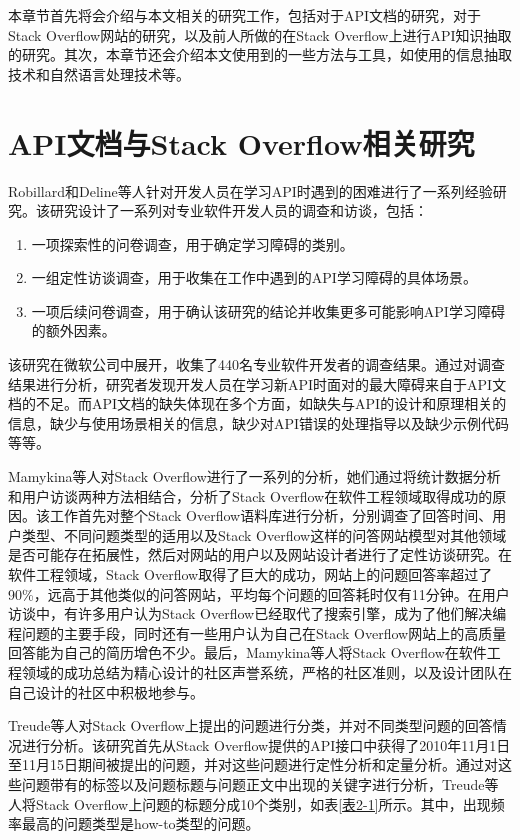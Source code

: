 本章节首先将会介绍与本文相关的研究工作，包括对于API文档的研究，对于Stack Overflow网站的研究，以及前人所做的在Stack Overflow上进行API知识抽取的研究。其次，本章节还会介绍本文使用到的一些方法与工具，如使用的信息抽取技术和自然语言处理技术等。

\section{API文档与Stack Overflow相关研究}
Robillard和Deline等人\cite{DBLP:journals/ese/RobillardD11}针对开发人员在学习API时遇到的困难进行了一系列经验研究。该研究设计了一系列对专业软件开发人员的调查和访谈，包括：

\begin{enumerate}
    \item 一项探索性的问卷调查，用于确定学习障碍的类别。
    \item 一组定性访谈调查，用于收集在工作中遇到的API学习障碍的具体场景。
    \item 一项后续问卷调查，用于确认该研究的结论并收集更多可能影响API学习障碍的额外因素。
\end{enumerate}

该研究在微软公司中展开，收集了440名专业软件开发者的调查结果。通过对调查结果进行分析，研究者发现开发人员在学习新API时面对的最大障碍来自于API文档的不足。而API文档的缺失体现在多个方面，如缺失与API的设计和原理相关的信息，缺少与使用场景相关的信息，缺少对API错误的处理指导以及缺少示例代码等等。

Mamykina等人\cite{DBLP:conf/chi/MamykinaMMHH11}对Stack Overflow进行了一系列的分析，她们通过将统计数据分析和用户访谈两种方法相结合\cite{DBLP:conf/chi/NamAA09}，分析了Stack Overflow在软件工程领域取得成功的原因。该工作首先对整个Stack Overflow语料库进行分析，分别调查了回答时间、用户类型、不同问题类型的适用以及Stack Overflow这样的问答网站模型对其他领域是否可能存在拓展性，然后对网站的用户以及网站设计者进行了定性访谈研究。在软件工程领域，Stack Overflow取得了巨大的成功，网站上的问题回答率超过了90\%，远高于其他类似的问答网站，平均每个问题的回答耗时仅有11分钟。在用户访谈中，有许多用户认为Stack Overflow已经取代了搜索引擎，成为了他们解决编程问题的主要手段，同时还有一些用户认为自己在Stack Overflow网站上的高质量回答能为自己的简历增色不少。最后，Mamykina等人将Stack Overflow在软件工程领域的成功总结为精心设计的社区声誉系统，严格的社区准则，以及设计团队在自己设计的社区中积极地参与。

Treude等人\cite{DBLP:conf/icse/TreudeBS11}对Stack Overflow上提出的问题进行分类，并对不同类型问题的回答情况进行分析。该研究首先从Stack Overflow提供的API接口中获得了2010年11月1日至11月15日期间被提出的问题，并对这些问题进行定性分析和定量分析。通过对这些问题带有的标签以及问题标题与问题正文中出现的关键字进行分析，Treude等人将Stack Overflow上问题的标题分成10个类别，如表\ref{表2-1}所示。其中，出现频率最高的问题类型是how-to类型的问题。

